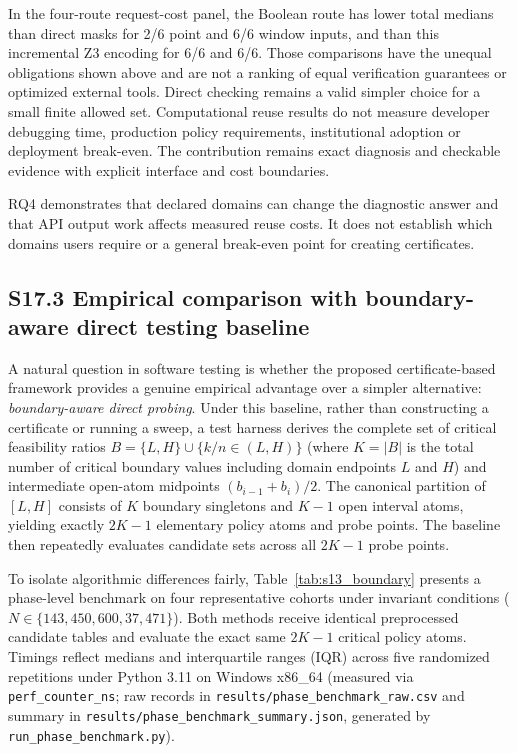\documentclass[11pt,a4paper]{article}
\theoremstyle{plain}
\theoremstyle{definition}
\theoremstyle{remark}
\begin{document}
In the four-route request-cost panel, the Boolean route has lower total medians than direct masks for 2/6 point and 6/6 window inputs, and than this incremental Z3 encoding for 6/6 and 6/6. Those comparisons have the unequal obligations shown above and are not a ranking of equal verification guarantees or optimized external tools. Direct checking remains a valid simpler choice for a small finite allowed set. Computational reuse results do not measure developer debugging time, production policy requirements, institutional adoption or deployment break-even. The contribution remains exact diagnosis and checkable evidence with explicit interface and cost boundaries.

RQ4 demonstrates that declared domains can change the diagnostic answer and that API output work affects measured reuse costs. It does not establish which domains users require or a general break-even point for creating certificates.


\subsection*{S17.3 Empirical comparison with boundary-aware direct testing baseline}\label{sec:s17_3}

A natural question in software testing is whether the proposed certificate-based framework provides a genuine empirical advantage over a simpler alternative: \textit{boundary-aware direct probing}. Under this baseline, rather than constructing a certificate or running a sweep, a test harness derives the complete set of critical feasibility ratios $B = \{L, H\} \cup \{k/n \in (L, H)\}$ (where $K = |B|$ is the total number of critical boundary values including domain endpoints $L$ and $H$) and intermediate open-atom midpoints $(b_{i-1} + b_i)/2$. The canonical partition of $[L, H]$ consists of $K$ boundary singletons and $K-1$ open interval atoms, yielding exactly $2K-1$ elementary policy atoms and probe points. The baseline then repeatedly evaluates candidate sets across all $2K-1$ probe points.

To isolate algorithmic differences fairly, Table~\ref{tab:s13_boundary} presents a phase-level benchmark on four representative cohorts under invariant conditions ($N \in \{143, 450, 600, 37{,}471\}$). Both methods receive identical preprocessed candidate tables and evaluate the exact same $2K-1$ critical policy atoms. Timings reflect medians and interquartile ranges (IQR) across five randomized repetitions under Python 3.11 on Windows x86\_64 (measured via \texttt{perf\_counter\_ns}; raw records in \texttt{results/phase\_benchmark\_raw.csv} and summary in \texttt{results/phase\_benchmark\_summary.json}, generated by \texttt{run\_phase\_benchmark.py}).
\end{document}
